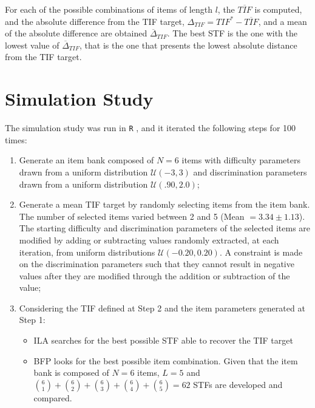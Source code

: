 \documentclass[12pt, a4paper, titilepage]{article}
\begin{document}
For each of the possible combinations of items of length $l$,  the $\overline{\mathit{TIF}}$ is computed, and the absolute difference from the TIF target, $\Delta_{TIF} = TIF^* - \overline{\mathit{TIF}}$, and a mean of the absolute difference are obtained $\overline{\Delta}_{TIF}$.
The best STF is the one with the lowest value of $\overline{\Delta}_{TIF}$, that is the one that presents the lowest absolute distance from the TIF target.


\section*{Simulation Study}
The simulation study was run in \texttt{R} \cite{rsoft}, and it iterated the following steps for 100 times: 

\begin{enumerate}
	\item  Generate an item bank composed of $N = 6$ items with difficulty parameters drawn from a uniform distribution $\mathcal{U}(-3, 3)$ and discrimination parameters drawn from a uniform distribution $\mathcal{U}(.90, 2.0)$;
	
	\item  Generate a mean TIF target by randomly selecting items from the item bank. The number of selected items varied between 2 and 5 (Mean $= 3.34 \pm 1.13$).
	The starting difficulty and discrimination parameters of the selected items are modified by adding or subtracting values randomly extracted, at each iteration, from uniform distributions $\mathcal{U}(-0.20, 0.20)$. A constraint is made on the discrimination parameters such that they cannot result in negative values after they are modified through the addition or subtraction of the value;
	
	
	\item  Considering the TIF defined at Step 2 and the item parameters generated at Step 1:
	\begin{itemize}
		\item ILA searches for the best possible STF able to recover the TIF target
		\item BFP looks for the best possible item combination. Given that the item bank is composed of $N=6$ items, $L = 5$ and $\binom{6}{1} + \binom{6}{2} + \binom{6}{3} + \binom{6}{4} + \binom{6}{5} =  62$ STFs are developed and compared.
	\end{itemize}
	
\end{enumerate}
\end{document}
